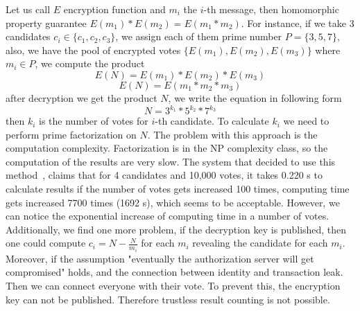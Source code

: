 \documentclass[applsci,article,accept,moreauthors,pdftex]{Definitions/mdpi}
\begin{document}
Let us call $E$ encryption function and $m_i$ the $i$-th message, then homomorphic property guarantee $E(m_1) * E(m_2) = E(m_1 * m_2)$. 
For instance, if we take 3 candidates $c_i \in \{c_1, c_2, c_3\}$, we assign each of them prime number $P = \{3, 5, 7\}$, also, we have the pool of encrypted votes $\{E(m_1), E(m_2), E(m_3)\}$ where $m_i \in P$, we compute the product 
\begin{equation}
  E(N) = E(m_1) * E(m_2) * E(m_3)  
\end{equation}
\begin{equation}
E(N) = E(m_1 * m_2 * m_3)
\end{equation}
after decryption we get the product $N$, we write the equation in following form 
\begin{equation}
N = 3^{k_1} * 5^{k_2} * 7^{k_3}
\end{equation}
then $k_i$ is the number of votes for $i$-th candidate. To calculate $k_i$ we need to perform prime factorization on $N$. 
The problem with this approach is the computation complexity. Factorization is in the NP complexity class, so the computation of the results are very slow. The system that decided to use this method~\cite{polys:online}, claims that for 4 candidates and 10,000 votes, it takes 0.220 s to calculate results if the number of votes gets increased 100 times, computing time gets increased 7700 times (1692 s), which seems to be acceptable. However, we can notice the exponential increase of computing time in a number of votes.
Additionally, we find one more problem, if the decryption key is published, then one could compute $c_i = N - \frac{N}{m_i}$ for each $m_i$ revealing the candidate for each $m_i$. Moreover, if the assumption "eventually the authorization server will get compromised" holds, and the connection between identity and transaction leak. Then we can connect everyone with their vote. To prevent this, the encryption key can not be published. Therefore trustless result counting is not possible.

\end{document}
